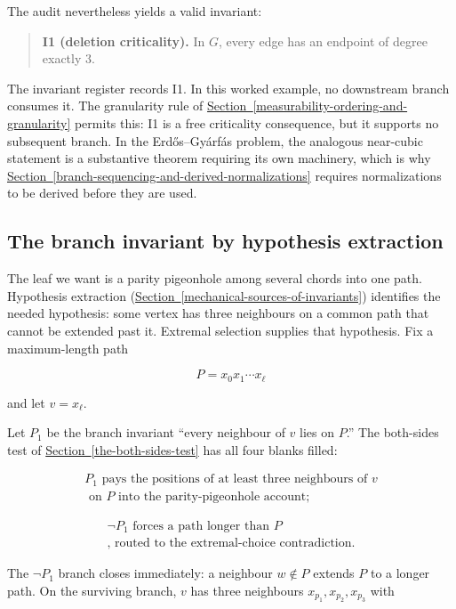\documentclass[
  11pt,
]{article}
\theoremstyle{definition}
\newcommand{\secref}[1]{\hyperref[#1]{Section~\ref*{#1}}}
\begin{document}
The audit nevertheless yields a valid invariant:

\begin{quote}
\textbf{I1 (deletion criticality).} In \(G\), every edge has an endpoint
of degree exactly \(3\).
\end{quote}

The invariant register records I1. In this worked example, no downstream
branch consumes it. The granularity rule of \secref{measurability-ordering-and-granularity} permits this:
I1 is a free criticality consequence, but it supports no subsequent
branch. In the Erdős--Gyárfás problem, the analogous near-cubic statement is
a substantive theorem requiring its own machinery, which is why \secref{branch-sequencing-and-derived-normalizations} requires normalizations to be derived before they are used.

\subsection{The branch invariant by hypothesis
extraction}\label{c.4-the-branch-invariant-by-hypothesis-extraction}

The leaf we want is a parity pigeonhole among several chords into one
path. Hypothesis extraction (\secref{mechanical-sources-of-invariants}) identifies the needed
hypothesis: some vertex has three neighbours on a common path that
cannot be extended past it. Extremal selection supplies that hypothesis.
Fix a maximum-length path

\[
P=x_0x_1\cdots x_\ell
\]

and let \(v=x_\ell\).

Let \(P_1\) be the branch invariant ``every neighbour of \(v\) lies on
\(P\).'' The both-sides test of \secref{the-both-sides-test} has all four blanks filled:

\[
\begin{gathered}
P_1 \text{ pays the positions of at least three neighbours of } v\\
\text{ on } P \text{ into the parity-pigeonhole account;}
\end{gathered}
\]

\[
\begin{gathered}
\neg P_1 \text{ forces a path longer than } P\\
\text{, routed to the extremal-choice contradiction.}
\end{gathered}
\]

The \(\neg P_1\) branch closes immediately: a neighbour \(w\notin P\)
extends \(P\) to a longer path. On the surviving branch, \(v\) has three
neighbours \(x_{p_1},x_{p_2},x_{p_3}\) with
\end{document}
